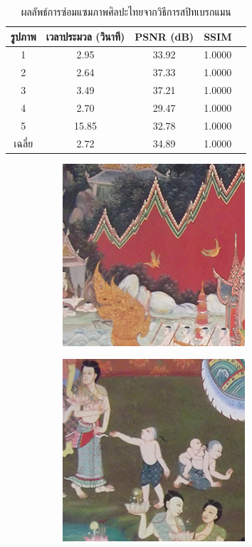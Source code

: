 \documentclass[hidelinks, a4paper,12pt]{article}
\numberwithin{equation}{section}							%
\numberwithin{equation}{section}
\begin{document}
{\begin{table}[H]
\begin{tabular}[ht]{|c|c|c|c|c|}
			รูปภาพ &เวลาประมวล  (วินาที) & PSNR (dB) & SSIM \\
			\hline
			1 & 2.95 & 33.92 & 1.0000 \\ 
			2 & 2.64 & 37.33 & 1.0000 \\
			3 &  3.49 & 37.21 & 1.0000 \\
			4 & 2.70  & 29.47  & 1.0000 \\
			5 & 15.85  & 32.78  & 1.0000 \\
			\hline
			เฉลี่ย & 2.72  & 34.89  & 1.0000 \\
			\hline
		\end{tabular}
		\caption{ผลลัพธ์การซ่อมแซมภาพศิลปะไทยจากวิธีการสปิทเบรกแมน}
	\end{table}
	\begin{figure}[H]
		\centering
		\begin{subfigure}{0.4\linewidth}
			\centering
			\includegraphics[width=0.8\linewidth]{images/result_ex4/multisplitbergman_case01.png}
		\end{subfigure}
		\begin{subfigure}{0.4\linewidth}
			\centering
			\includegraphics[width=0.8\linewidth]{images/result_ex4/multisplitbergman_case02.png}

\end{subfigure}
\end{figure}}
\end{document}
